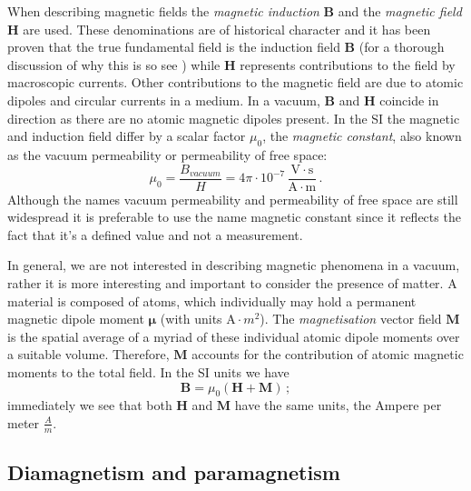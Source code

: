 When describing magnetic fields the \textit{magnetic induction} $\mathbf{B}$ and the \textit{magnetic field} $\mathbf{H}$ are used. These denominations are of historical character and it has been proven that the true fundamental field is the induction field $\mathbf{B}$ (for a thorough discussion of why this is so see \citet{Feynman}) while $\mathbf{H}$ represents contributions to the field by macroscopic currents. Other contributions to the magnetic field are due to atomic dipoles and circular currents in a medium. In a vacuum, $\mathbf{B}$ and $\mathbf{H}$ coincide in direction as there are no atomic magnetic dipoles present. In the SI the magnetic and induction field differ by a scalar factor $\mu_0$, the \textit{magnetic constant}, also known as the vacuum permeability or permeability of free space:
\begin{equation}
\mu_0 = \frac{B_{\textit{vacuum}}}{H} = 4 \pi \cdot 10^{-7} \, \frac{\mathrm{V}\cdot\mathrm{s}}{\mathrm{A}\cdot\mathrm{m}} \, .
\end{equation}
Although the names vacuum permeability and permeability of free space are still widespread it is preferable to use the name magnetic constant since it reflects the fact that it's a defined value and not a measurement.\par

In general, we are not interested in describing magnetic phenomena in a vacuum, rather it is more interesting and important to consider the presence of matter. A material is composed of atoms, which individually may hold a permanent magnetic dipole moment $\mathbf{\mu}$ (with units $\mathrm{A}\cdot m^2$). The \textit{magnetisation} vector field $\mathbf{M}$ is the spatial average of a myriad of these individual atomic dipole moments over a suitable volume. Therefore, $\mathbf{M}$ accounts for the contribution of atomic magnetic moments to the total field. In the SI units we have
\begin{equation}
\mathbf{B} = \mu_0 (\mathbf{H}+\mathbf{M})\, ;
\end{equation}
immediately we see that both $\mathbf{H}$ and $\mathbf{M}$ have the same units, the Ampere per meter $\frac{A}{m}$.

\subsection{Diamagnetism and paramagnetism}

